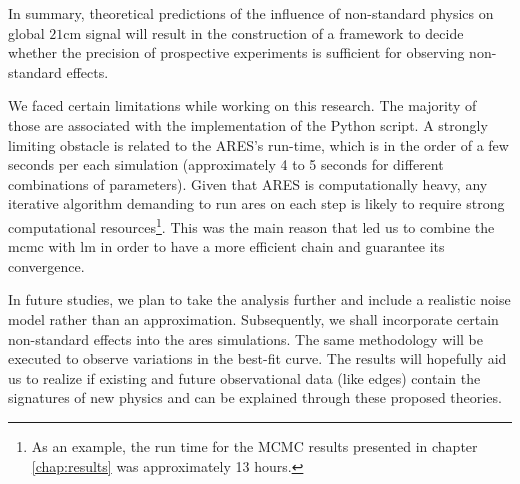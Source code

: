 \documentclass[12pt, TexShade, letterpaper]{report}
\begin{document}
In summary, theoretical predictions of the influence of non-standard physics on global $\mathrm{21cm}$ signal will result in the construction of a framework to decide whether the precision of prospective experiments is sufficient for observing non-standard effects.\par

We faced certain limitations while working on this research. The majority of those are associated with the implementation of the Python script. 
A strongly limiting obstacle is related to the ARES's run-time, which is in the order of a few seconds per each simulation (approximately 4 to 5 seconds for different combinations of parameters). Given that ARES is computationally heavy, any iterative algorithm demanding to run \gls{ares} on each step is likely to require strong computational resources\footnote{ As an example, the run time for the MCMC results presented in chapter \ref{chap:results} was approximately 13 hours.}. This was the main reason that led us to combine the \gls{mcmc} with \gls{lm} in order to have a more efficient chain and guarantee its convergence.\par 

In future studies, we plan to take the analysis further and include a realistic noise model rather than an approximation. Subsequently, we shall incorporate certain non-standard effects into the \gls{ares} simulations. The same methodology will be executed to observe variations in the best-fit curve. 
The results will hopefully aid us to realize if existing and future observational data (like \gls{edges}) contain the signatures of new physics and can be explained through these proposed theories.\par

	{
	
	
	
	
	}
\end{document}

